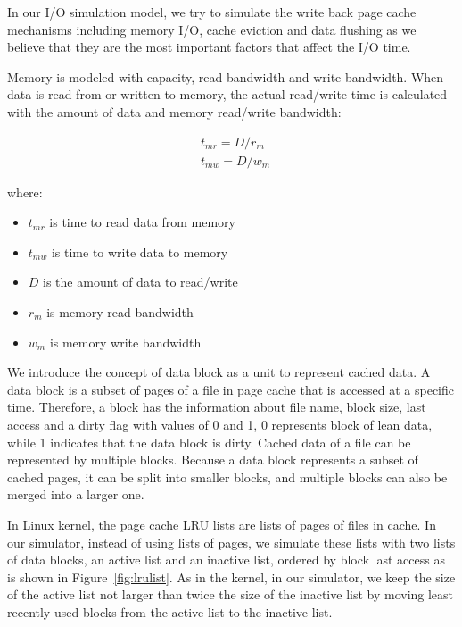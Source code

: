 \documentclass[conference]{IEEEtran}
\begin{document}
			In our I/O simulation model, we try to simulate the write back page cache 
			mechanisms including memory I/O, cache eviction and data flushing as we 
			believe that they are the most important factors that affect the I/O time. 

			Memory is modeled with capacity, read bandwidth and write 
			bandwidth. When data is read from or written to memory, the actual 
			read/write time is calculated with the amount of data and memory 
			read/write bandwidth:
			
			\begin{align*}
				& t_{mr} = D / r_m \\ 
				& t_{mw} = D / w_m\
			\end{align*}		
			
			where:
			\begin{itemize}
				\item $t_{mr}$ is time to read data from memory
				\item $t_{mw}$ is time to write data to memory
				\item $D$ is the amount of data to read/write
				\item $r_m$ is memory read bandwidth
				\item $w_m$ is memory write bandwidth
			\end{itemize}						
			
			We introduce the concept of data block as a unit to represent cached data. 
			A data block is a subset of pages of a file in page cache that is accessed 
			at a specific time. Therefore, a block has the information about file name, 
			block size, last access and a dirty flag with values of 0 and 1, 
			0 represents block of lean data, while 1 indicates that the data block 
			is dirty. 
			Cached data of a file can be represented by multiple blocks. 
			Because a data block represents a subset of cached pages, 
			it can be split into smaller blocks, and multiple blocks can also 
			be merged into a larger one.
			
			In Linux kernel, the page cache LRU lists are lists of pages of 
			files in cache. In our simulator, instead of using lists of pages, 
			we simulate these lists with two lists of data blocks, an active list and 
			an inactive list, ordered by block last access as is shown in 
			Figure~\ref{fig:lrulist}.
			As in the kernel, in our simulator, we keep the size of the active list not 
			larger than twice the size of the inactive list by moving least recently 
			used blocks from the active list to the inactive list. 
			
\end{document}
